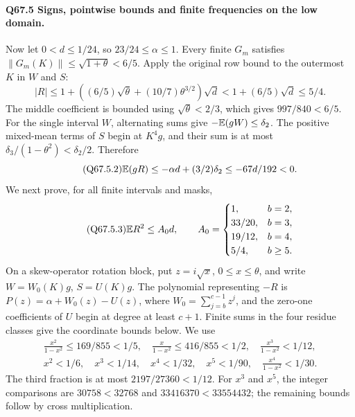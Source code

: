 \paragraph{Q67.5 Signs, pointwise bounds and finite frequencies on the low domain.}
Now let \(0<\allowbreak d\le\allowbreak 1/24\), so \(23/24\le\allowbreak \alpha\le\allowbreak 1\).
Every finite \(G_m\) satisfies \(\|G_m(K)\|\le\allowbreak \sqrt{1+\theta}<\allowbreak 6/5\).
Apply the original row bound to the outermost \(K\) in \(W\) and \(S\):
\begin{equation}\tag{Q67.5.1}\label{eq:Q67:5.1}
|R|\le1+\left((6/5)\sqrt\theta+(10/7)\theta^{3/2}\right)\sqrt d
<1+(6/5)\sqrt d\le5/4.
\end{equation}
The middle coefficient is bounded using \(\sqrt\theta<\allowbreak 2/3\),
which gives \(997/840<\allowbreak 6/5\).
For the single interval \(W\), alternating sums give
\(-\mathbb E(gW)\le\allowbreak \delta_2\). The positive mixed-mean terms of \(S\)
begin at \(K^4g\), and their sum is at most
\(\delta_3/(1-\theta^2)<\allowbreak \delta_2/2\). Therefore
\begin{equation}\tag{Q67.5.2}\label{eq:Q67:5.2}
\mathbb E(gR)\le-\alpha d+(3/2)\delta_2\le-67d/192<0.
\end{equation}
We next prove, for all finite intervals and masks,
\begin{equation}\tag{Q67.5.3}\label{eq:Q67:5.3}
\mathbb E R^2\le A_0d,\qquad
A_0=\begin{cases}
1,&b=2,\\33/20,&b=3,\\19/12,&b=4,\\5/4,&b\ge5.
\end{cases}
\end{equation}
On a skew-operator rotation block, put \(z=\allowbreak i\sqrt x\),
\(0\le\allowbreak  x\le\allowbreak \theta\), and write \(W=\allowbreak W_0(K)g\), \(S=\allowbreak U(K)g\).
The polynomial representing \(-R\) is
\(P(z)=\allowbreak \alpha+W_0(z)-U(z)\), where
\(W_0=\allowbreak \sum_{j=\allowbreak b}^{c-1}z^j\), and the zero-one coefficients of \(U\)
begin at degree at least \(c+1\). Finite sums in the four residue
classes give the coordinate bounds below. We use
\begin{equation}\tag{Q67.5.4}\label{eq:Q67:5.4}
\begin{gathered}
\frac{x^2}{1-x^2}\le169/855<1/5,\quad
\frac{x}{1-x^2}\le416/855<1/2,\quad
\frac{x^3}{1-x^2}<1/12,\\
x^2<1/6,\quad x^3<1/14,\quad x^4<1/32,\quad
x^5<1/90,\quad\frac{x^4}{1-x^2}<1/30.
\end{gathered}
\end{equation}
The third fraction is at most \(2197/27360<\allowbreak 1/12\).
For \(x^3\) and \(x^5\), the integer comparisons are
\(30758<\allowbreak 32768\) and \(33416370<\allowbreak 33554432\); the remaining bounds
follow by cross multiplication.

